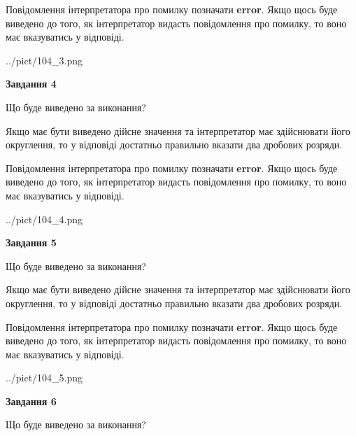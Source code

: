 \documentclass[12pt, ukrainian]{article}
\begin{document}
{\begin {Large}
Повідомлення інтерпретатора про помилку позначати \textbf{error}.
Якщо щось буде виведено до того, як інтерпретатор видасть повідомлення про помилку, 
то воно має вказуватись у відповіді. \par

\begin{center}
	{../pict/104_3.png}
\end{center}
\newpage

{\begin {center}\textbf{Завдання 4}\end {center}}\par
Що буде виведено за виконання? \par

Якщо має бути виведено дійсне значення та інтерпретатор має здійснювати його округлення, 
то у відповіді достатньо правильно вказати два дробових розряди.

Повідомлення інтерпретатора про помилку позначати \textbf{error}.
Якщо щось буде виведено до того, як інтерпретатор видасть повідомлення про помилку, 
то воно має вказуватись у відповіді. \par

\begin{center}
	{../pict/104_4.png}
\end{center}
\newpage

{\begin {center}\textbf{Завдання 5}\end {center}}\par
Що буде виведено за виконання? \par

Якщо має бути виведено дійсне значення та інтерпретатор має здійснювати його округлення, 
то у відповіді достатньо правильно вказати два дробових розряди.

Повідомлення інтерпретатора про помилку позначати \textbf{error}.
Якщо щось буде виведено до того, як інтерпретатор видасть повідомлення про помилку, 
то воно має вказуватись у відповіді. \par

\begin{center}
	{../pict/104_5.png}
\end{center}
\newpage

{\begin {center}\textbf{Завдання 6}\end {center}}\par
Що буде виведено за виконання? \par


\end{Large}}
\end{document}
